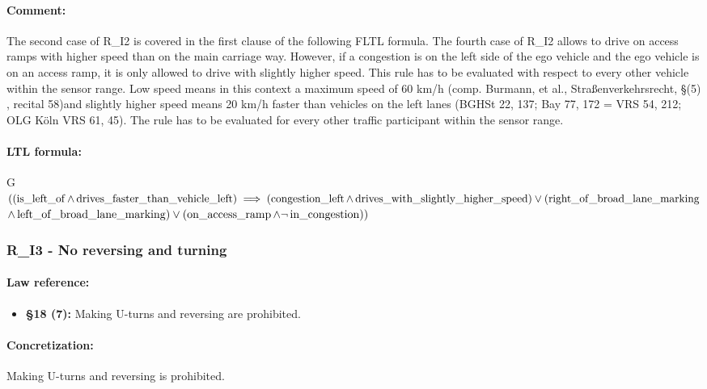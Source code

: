 \paragraph{Comment:} The second case of R\_I2 is covered in the first clause of the following FLTL formula. The fourth case of R\_I2 allows to drive on access ramps with higher speed than on the main carriage way. However, if a congestion is on the left side of the ego vehicle and the ego vehicle is on an access ramp, it is only allowed to drive with slightly higher speed. This rule has to be evaluated with respect to every other vehicle within the sensor range. Low speed means in this context a maximum speed of 60 km/h (comp. Burmann, et al., Straßenverkehrsrecht, \stvo \S (5) , recital 58)and slightly higher speed means 20 km/h faster than vehicles on the left lanes (BGHSt 22, 137; Bay 77, 172 = VRS 54, 212; OLG Köln VRS 61, 45).  The rule has to be evaluated for every other traffic participant within the sensor range.

\paragraph{LTL formula:} G$((\operatorname*{is\_left\_of} \land \operatorname*{drives\_faster\_than\_vehicle\_left}) \\ \implies (\operatorname*{congestion\_left} \land \operatorname*{drives\_with\_slightly\_higher\_speed}) \lor (\operatorname*{right\_of\_broad\_lane\_marking}$ \\
$\land \operatorname*{left\_of\_broad\_lane\_marking}) \lor (\operatorname*{on\_access\_ramp} \land \neg \operatorname*{in\_congestion}))$



\subsubsection{R\_I3 - No reversing and turning}
\paragraph{Law reference:}
\begin{itemize}
	\item \textbf{\stvo \S 18 (7):} Making U-turns and reversing are prohibited.
\end{itemize}

\paragraph{Concretization:} Making U-turns and reversing is prohibited.


